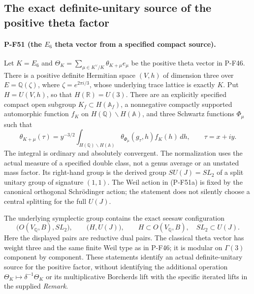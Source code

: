 \subsection{The exact definite-unitary source of the positive theta factor}
\label{sec:definite-theta-factor}

\paragraph{P-F51 (the $E_6$ theta vector from a specified compact source).}
Let $K=E_6$ and $\Theta_K=\sum_{\mu\in K^\vee/K}
\theta_{K+\mu}e_\mu$ be the positive theta vector in P-F46.
There is a positive definite Hermitian space $(V,h)$ of
dimension three over $E=\mathbb Q(\zeta)$, where
$\zeta=e^{2\pi i/3}$, whose underlying trace lattice is
exactly $K$. Put $H=U(V,h)$, so that $H(\mathbb R)=U(3)$.
There are an explicitly specified compact open subgroup
$K_f\subset H(\mathbb A_f)$, a nonnegative compactly
supported automorphic function $f_K$ on
$H(\mathbb Q)\backslash H(\mathbb A)$, and three
Schwartz functions $\Phi_\mu$ such that
\[
 \theta_{K+\mu}(\tau)
   =y^{-3/2}\int_{H(\mathbb Q)\backslash H(\mathbb A)}
       \theta_{\Phi_\mu}(g_\tau,h) f_K(h)\,dh,
 \qquad \tau=x+iy.
 \tag{P-F51a}
\]
The integral is ordinary and absolutely convergent.
The normalization uses the actual measure of a specified
double class, not a genus average or an unstated mass factor.
Its right-hand group is the derived group
$SU(J)=SL_2$ of a split unitary group of signature $(1,1)$.
The Weil action in (P-F51a) is fixed by the canonical
orthogonal Schr\"odinger action; the statement does not
silently choose a central splitting for the full $U(J)$.

The underlying symplectic group contains the exact
seesaw configuration
\[
 \bigl(O(V_{\mathbb Q},B),SL_2\bigr),\qquad
 \bigl(H,U(J)\bigr),\qquad
 H\subset O(V_{\mathbb Q},B),\quad SL_2\subset U(J).
 \tag{P-F51b}
\]
Here the displayed pairs are reductive dual pairs.
The classical theta vector has weight three and the
same finite Weil type as in P-F46; it is modular on
$\Gamma(3)$ component by component. These statements
identify an actual definite-unitary source for the
positive factor, without identifying the additional
operation $\Theta_K\mapsto\delta^{-1}\Theta_K$ or its
multiplicative Borcherds lift with the specific iterated
lifts in the supplied \emph{Remark}.

